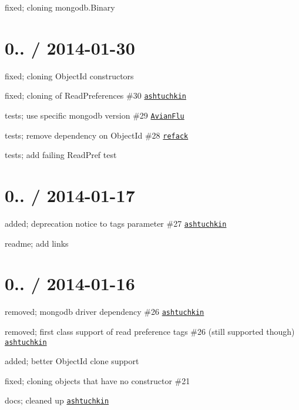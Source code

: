 \begin{DoxyItemize}
\item fixed; cloning mongodb.\+Binary
\end{DoxyItemize}

\section*{0.. / 2014-\/01-\/30 }


\begin{DoxyItemize}
\item fixed; cloning Object\+Id constructors
\item fixed; cloning of Read\+Preferences \#30 \href{https://github.com/ashtuchkin}{\tt ashtuchkin}
\item tests; use specific mongodb version \#29 \href{https://github.com/AvianFlu}{\tt Avian\+Flu}
\item tests; remove dependency on Object\+Id \#28 \href{https://github.com/refack}{\tt refack}
\item tests; add failing Read\+Pref test
\end{DoxyItemize}

\section*{0.. / 2014-\/01-\/17 }


\begin{DoxyItemize}
\item added; deprecation notice to tags parameter \#27 \href{https://github.com/ashtuchkin}{\tt ashtuchkin}
\item readme; add links
\end{DoxyItemize}

\section*{0.. / 2014-\/01-\/16 }


\begin{DoxyItemize}
\item removed; mongodb driver dependency \#26 \href{https://github.com/ashtuchkin}{\tt ashtuchkin}
\item removed; first class support of read preference tags \#26 (still supported though) \href{https://github.com/ashtuchkin}{\tt ashtuchkin}
\item added; better Object\+Id clone support
\item fixed; cloning objects that have no constructor \#21
\item docs; cleaned up \href{https://github.com/ashtuchkin}{\tt ashtuchkin}
\end{DoxyItemize}

